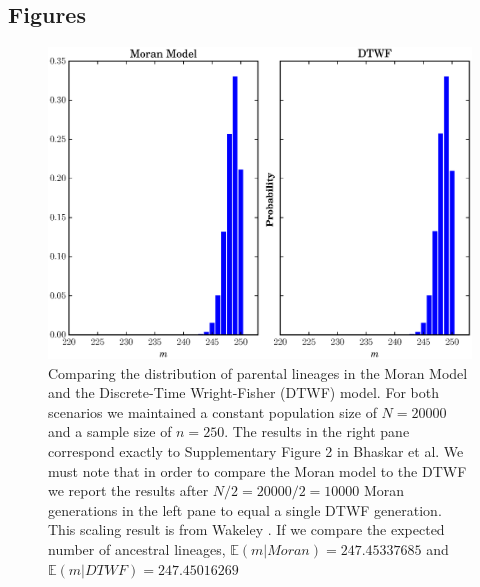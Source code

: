 \documentclass[11pt]{article}
\begin{document}
{}


\newpage

\subsection{Figures}

\begin{center}
	\begin{figure}[!ht]
		\includegraphics[scale=0.85]{../plots/moran_figure1}
		\caption{Comparing the distribution of parental lineages in the Moran Model and the Discrete-Time Wright-Fisher (DTWF) model. For both scenarios we maintained a constant population size of $N = 20000$ and a sample size of $n=250$. The results in the right pane correspond exactly to Supplementary Figure 2 in Bhaskar et al. We must note that in order to compare the Moran model to the DTWF we report the results after $N/2 = 20000/2 = 10000$ Moran generations in the left pane to equal a single DTWF generation. This scaling result is from Wakeley \cite{Wakeley2008}. If we compare the expected number of ancestral lineages, $\mathbb{E}(m | Moran) = 247.45337685$ and  $\mathbb{E}(m | DTWF) = 247.45016269$}
	\end{figure}
\end{center}
\end{document}
